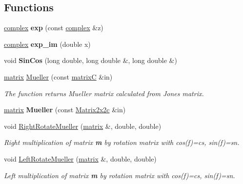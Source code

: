 \subsection*{Functions}
\begin{DoxyCompactItemize}
\item 
\mbox{\label{group___ax_func_ga51f6277e09dfe3ef1f168fc188f3e0d4}} 
\mbox{\hyperlink{classcomplex}{complex}} {\bfseries exp} (const \mbox{\hyperlink{classcomplex}{complex}} \&z)
\item 
\mbox{\label{group___ax_func_ga688d8a6a461b1cc3dd6fedf784f20d12}} 
\mbox{\hyperlink{classcomplex}{complex}} {\bfseries exp\+\_\+im} (double x)
\item 
\mbox{\label{group___ax_func_ga9aafc8a193f0c5775eb9dc1f5aa4bac7}} 
void {\bfseries Sin\+Cos} (long double, long double \&, long double \&)
\item 
\mbox{\hyperlink{classmatrix}{matrix}} \mbox{\hyperlink{group___ax_func_gaa3c0276f7292390c42f6a0e54912f243}{Mueller}} (const \mbox{\hyperlink{classmatrix_c}{matrixC}} \&in)
\begin{DoxyCompactList}\small\item\em The function returns Mueller matrix calculated from Jones matrix. \end{DoxyCompactList}\item 
\mbox{\label{group___ax_func_ga0061c1dfe590faee5df2b2bfe8543ebc}} 
\mbox{\hyperlink{classmatrix}{matrix}} {\bfseries Mueller} (const \mbox{\hyperlink{class_matrix2x2c}{Matrix2x2c}} \&in)
\item 
void \mbox{\hyperlink{group___ax_func_ga4caf171817a28cab6689b5a05ac15ee9}{Right\+Rotate\+Mueller}} (\mbox{\hyperlink{classmatrix}{matrix}} \&, double, double)
\begin{DoxyCompactList}\small\item\em Right multiplication of matrix {\bfseries m} by {\itshape  rotation matrix } with cos(f)=cs, sin(f)=sn. \end{DoxyCompactList}\item 
void \mbox{\hyperlink{group___ax_func_ga741a2cc01b63499350d7c4bd63b8e1bf}{Left\+Rotate\+Mueller}} (\mbox{\hyperlink{classmatrix}{matrix}} \&, double, double)
\begin{DoxyCompactList}\small\item\em Left multiplication of matrix {\bfseries m} by {\itshape  rotation matrix } with cos(f)=cs, sin(f)=sn. \end{DoxyCompactList}\item 

\end{DoxyCompactItemize}

